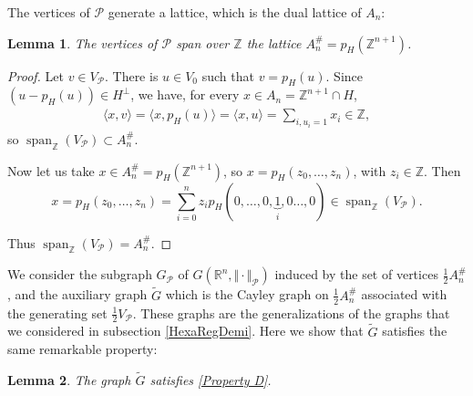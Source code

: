 \documentclass{amsart}                     %
\newtheorem{lemm}{Lemma}
\newcommand{\Z}{{\mathbb Z}}
\newcommand{\R}{{\mathbb R}}
\newcommand{\Span}{\operatorname{span}}
\begin{document}
The vertices of $\mathcal{P}$ generate a lattice, which is the dual lattice of $A_n$:

\begin{lemm}
The vertices of $\mathcal{P} $ span over $\Z$ the lattice  $ A_n^\# = p_H(\Z^{n+1}) $.
\end{lemm}

\begin{proof}
Let $v\in V_{\mathcal{P}}$. There is $u\in V_0$ such that $v=p_H(u)$. Since $(u-p_H(u))\in H^\perp$, we have, for every $x\in A_n = \Z^{n+1}\cap H$,
$$ \begin{aligned} \langle x, v\rangle = \langle x, p_H(u) \rangle = \langle x, u\rangle = \sum_{i,u_i=1} x_i \in \Z ,\end{aligned}$$
so $\Span_\Z(V_\mathcal{P})\subset A_n ^\#$.

Now let us take $x\in A_n^\# = p_H(\Z^{n+1})$, so $x=p_H(z_0,\ldots,z_n)$, with $z_i\in \Z$. Then 
$$x = p_H(z_0,\ldots,z_n)=\sum_{i=0}^n z_ip_H(0,\ldots,0,\underbrace{1}_i,0\ldots, 0)\in \Span_\Z(V_\mathcal{P}).$$

Thus $\Span_\Z(V_\mathcal{P})=A_n ^\#$.
\end{proof}

We consider  the subgraph $G_\mathcal{P}$ of $G(\R^n,\Vert \cdot \Vert_\mathcal{P})$ induced by the set of vertices $\frac{1}{2} A_n ^\#$, and  the auxiliary graph $\tilde{G}$ which is the Cayley graph on $\frac{1}{2} A_n ^\#$
associated with the generating set $\frac{1}{2}V_\mathcal{P}$. These graphs  are the generalizations of the graphs that we considered in subsection \ref{HexaRegDemi}. Here we show that $\tilde{G}$ satisfies the same remarkable property:

\begin{lemm}\label{DP1DG2An}
The graph $\tilde{G}$ satisfies \eqref{Property D}.
\end{lemm} 
\end{document}
